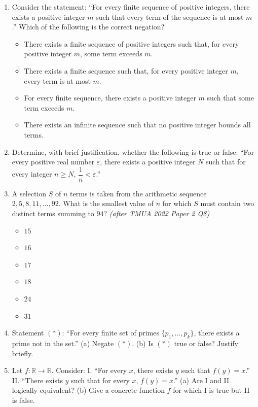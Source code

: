 \documentclass[11pt,a4paper]{article}
\begin{document}
\begin{enumerate}

\item Consider the statement: ``For every finite sequence of positive integers, there exists a positive integer $m$ such that every term of the sequence is at most $m$.'' Which of the following is the correct negation?
\begin{itemize}
\item[A)] There exists a finite sequence of positive integers such that, for every positive integer $m$, some term exceeds $m$.
\item[B)] There exists a finite sequence such that, for every positive integer $m$, every term is at most $m$.
\item[C)] For every finite sequence, there exists a positive integer $m$ such that some term exceeds $m$.
\item[D)] There exists an infinite sequence such that no positive integer bounds all terms.
\end{itemize}

\item Determine, with brief justification, whether the following is true or false: ``For every positive real number $\varepsilon$, there exists a positive integer $N$ such that for every integer $n\geq N$, $\dfrac1n<\varepsilon$.''

\item A selection $S$ of $n$ terms is taken from the arithmetic sequence $2,5,8,11,\dots,92$. What is the smallest value of $n$ for which $S$ must contain two distinct terms summing to $94$? \textit{\small(after TMUA 2022 Paper 2 Q8)}
\begin{itemize}
\item[A)] $15$
\item[B)] $16$
\item[C)] $17$
\item[D)] $18$
\item[E)] $24$
\item[F)] $31$
\end{itemize}

\item Statement $(*)$: ``For every finite set of primes $\{p_1,\dots,p_k\}$, there exists a prime not in the set.'' (a) Negate $(*)$. (b) Is $(*)$ true or false? Justify briefly.

\item Let $f:\mathbb{R}\to\mathbb{R}$. Consider: I. ``For every $x$, there exists $y$ such that $f(y)=x$.'' II. ``There exists $y$ such that for every $x$, $f(y)=x$.'' (a) Are I and II logically equivalent? (b) Give a concrete function $f$ for which I is true but II is false.

\end{enumerate}

\end{document}
